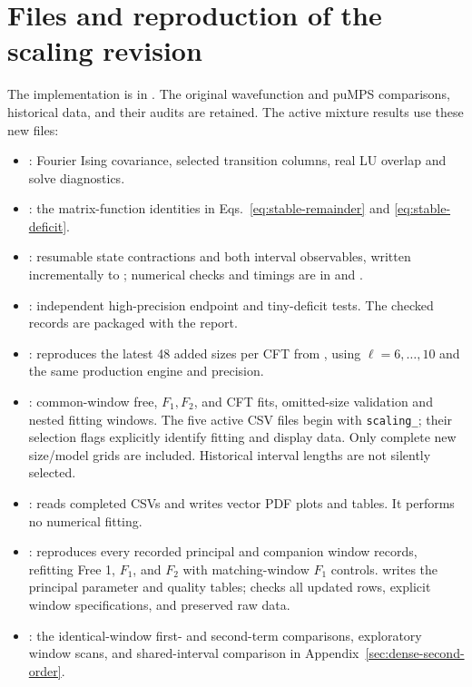 \section{Files and reproduction of the scaling revision}
The implementation is in . The original
wavefunction and puMPS comparisons, historical data, and their audits
are retained. The active mixture results use these new files:
\begin{itemize}
\item {}: Fourier Ising covariance, selected
transition columns, real LU overlap and solve diagnostics.
\item {}: the matrix-function identities in
Eqs.~\eqref{eq:stable-remainder} and \eqref{eq:stable-deficit}.
\item {}: resumable state contractions and both
interval observables, written incrementally to
; numerical checks and timings
are in  and .
\item {}: independent high-precision endpoint and
tiny-deficit tests. The checked records are packaged with the report.
\item {}: reproduces the latest 48 added
sizes per CFT from , using
$\ell=6,\ldots,10$ and the same production engine and precision.
\item {}: common-window free, $F_1,F_2$, and CFT fits,
omitted-size validation and nested fitting windows. The five active
CSV files begin with \texttt{scaling\_}; their selection flags explicitly
identify fitting and display data. Only complete new size/model grids
are included. Historical interval lengths are not silently selected.
\item {}: reads completed CSVs and writes
vector PDF plots and tables. It performs no numerical fitting.
\item {}: reproduces every recorded
principal and companion window records, refitting Free 1, $F_1$, and $F_2$ with
matching-window $F_1$ controls.  writes the principal
parameter and quality tables; 
checks all updated rows, explicit window specifications, and preserved raw data.
\item {}: the identical-window first- and second-term
comparisons, exploratory window scans, and shared-interval comparison in
Appendix~\ref{sec:dense-second-order}.
\end{itemize}
